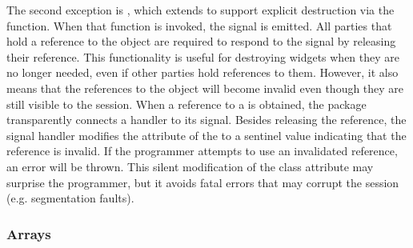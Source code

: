 \documentclass[article,shortnames]{jss}
\begin{document}
The second exception is , which extends 
to support explicit destruction via the 
function. When that function is invoked, the  signal is
emitted. All parties that hold a reference to the object are required
to respond to the signal by releasing their reference. This
functionality is useful for destroying widgets when they are no longer
needed, even if other parties hold references to them. However, it
also means that the  references to the object will become
invalid even though they are still visible to the 
session. When a reference to a  is obtained, the
 package transparently connects a handler to its
 signal.
Besides releasing the reference, the signal handler modifies the
 attribute of the  to a sentinel value
indicating that the reference is invalid.  If the programmer attempts
to use an invalidated reference, an error will be thrown.  This silent
modification of the class attribute may surprise the 
programmer, but it avoids fatal errors that may corrupt the
 session
(e.g. segmentation faults).

\subsubsection{Arrays}
\end{document}
